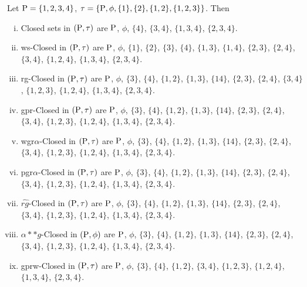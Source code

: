 \begin{exm}\label{exm2.2.15}
Let $\mathrm{P} = \{1, 2, 3, 4\}$, $\tau = \{\mathrm{P},\phi, \{1\}, \{2\}, \{1, 2\}, \{1, 2, 3\}\}$. Then 
\begin{enumerate}[(i)]
\item Closed sets in $(\mathrm{P}, \tau)$ are $\mathrm{P}$, $\phi$, $\{4\}$, $\{3, 4\}$, $\{1, 3, 4\}$, $\{2, 3, 4\}$.

\item ws-Closed in $(\mathrm{P}, \tau)$ are $\mathrm{P}$, $\phi$, $\{1\}$, $\{2\}$, $\{3\}$, $\{4\}$, $\{1, 3\}$, $\{1, 4\}$, $\{2, 3\}$, $\{2, 4\}$, $\{3, 4\}$, $\{1, 2, 4\}$, $\{1, 3, 4\}$, $\{2, 3, 4\}$.

\item rg-Closed in $(\mathrm{P}, \tau)$ are $\mathrm{P}$, $\phi$, $\{3\}$, $\{4\}$, $\{1, 2\}$, $\{1, 3\}$, $\{1 4\}$, $\{2, 3\}$, $\{2, 4\}$, $\{3, 4\}$, $\{1, 2, 3\}$, $\{1, 2, 4\}$, $\{1, 3, 4\}$, $\{2, 3, 4\}$.

\item gpr-Closed in $(\mathrm{P}, \tau)$ are $\mathrm{P}$, $\phi$, $\{3\}$, $\{4\}$, $\{1, 2\}$, $\{1, 3\}$, $\{1 4\}$, $\{2, 3\}$, $\{2, 4\}$, $\{3, 4\}$, $\{1, 2, 3\}$, $\{1, 2, 4\}$, $\{1, 3, 4\}$, $\{2, 3, 4\}$.

\item wgr$\alpha$-Closed in $(\mathrm{P}, \tau)$ are $\mathrm{P}$, $\phi$, $\{3\}$, $\{4\}$, $\{1, 2\}$, $\{1, 3\}$, $\{1 4\}$, $\{2, 3\}$, $\{2, 4\}$, $\{3, 4\}$, $\{1, 2, 3\}$, $\{1, 2, 4\}$, $\{1, 3, 4\}$, $\{2, 3, 4\}$.

\item pgr$\alpha$-Closed in $(\mathrm{P}, \tau)$ are $\mathrm{P}$, $\phi$, $\{3\}$, $\{4\}$, $\{1, 2\}$, $\{1, 3\}$, $\{1 4\}$, $\{2, 3\}$, $\{2, 4\}$, $\{3, 4\}$, $\{1, 2, 3\}$, $\{1, 2, 4\}$, $\{1, 3, 4\}$, $\{2, 3, 4\}$.

\item $\widehat{rg}$-Closed in $(\mathrm{P}, \tau)$ are $\mathrm{P}$, $\phi$, $\{3\}$, $\{4\}$, $\{1, 2\}$, $\{1, 3\}$, $\{1 4\}$, $\{2, 3\}$, $\{2, 4\}$, $\{3, 4\}$, $\{1, 2, 3\}$, $\{1, 2, 4\}$, $\{1, 3, 4\}$, $\{2, 3, 4\}$.

\item $\alpha{*}{*} g$-Closed in $(\mathrm{P}, \phi)$ are $\mathrm{P}$, $\phi$, $\{3\}$, $\{4\}$, $\{1, 2\}$, $\{1, 3\}$, $\{1 4\}$, $\{2, 3\}$, $\{2, 4\}$, $\{3, 4\}$, $\{1, 2,3\}$, $\{1, 2, 4\}$, $\{1, 3, 4\}$, $\{2, 3, 4\}$.

\item gprw-Closed in $(\mathrm{P}, \tau)$ are $\mathrm{P}$, $\phi$, $\{3\}$, $\{4\}$, $\{1, 2\}$, $\{3, 4\}$, $\{1, 2, 3\}$, $\{1, 2, 4\}$, $\{1, 3, 4\}$, $\{2, 3,4\}$.


\end{enumerate}
\end{exm}
